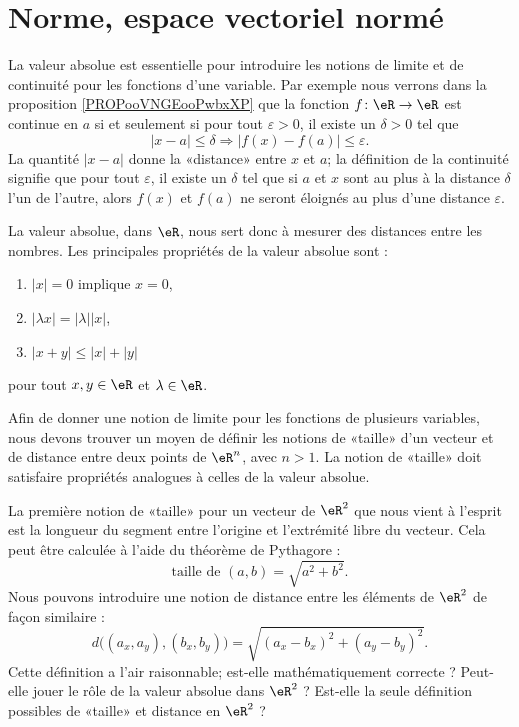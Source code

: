 \section{Norme, espace vectoriel normé}
\label{SECooWKJNooKOqpsx}

La valeur absolue est essentielle pour introduire les notions de limite et de continuité pour les fonctions d'une variable. Par exemple nous verrons dans la proposition \ref{PROPooVNGEooPwbxXP} que la fonction \( f\colon \eR\to \eR\) est continue en \( a\) si et seulement si pour tout $\varepsilon > 0$, il existe un $\delta > 0$ tel que
  \begin{equation}
    | x-a |\leq\delta \Rightarrow | f(x)-f(a) |\leq \varepsilon.
  \end{equation}
La quantité $| x-a |$ donne la «distance» entre $x$ et $a$; la définition de la continuité signifie que pour tout $\varepsilon$, il existe un $\delta$ tel que si $a$ et $x$ sont au plus à la distance $\delta$ l'un de l'autre, alors $f(x)$ et $f(a)$ ne seront éloignés au plus d'une distance $\varepsilon$.

La valeur absolue, dans $\eR$, nous sert donc à mesurer des distances entre les nombres. Les principales propriétés de la valeur absolue sont :
\begin{enumerate}

	\item
		$| x |=0$ implique $x=0$,
	\item
		$| \lambda x |=| \lambda | |x |$,
	\item
		$| x+y |\leq | x |+| y |$

\end{enumerate}
pour tout $x,y\in\eR$ et $\lambda\in\eR$.

Afin de donner une notion de limite pour les fonctions de plusieurs variables, nous devons trouver un moyen de définir les notions de «taille» d'un vecteur et de distance entre deux points de $\eR^n$, avec $n>1$. La notion de «taille» doit satisfaire propriétés analogues à celles de la valeur absolue.

La première notion de «taille» pour un vecteur de $\eR^2$ que nous vient à l'esprit est la longueur du segment entre l'origine et l'extrémité libre du vecteur. Cela peut être calculée à l'aide du théorème de Pythagore :
\begin{equation}
  \textrm{taille de } (a,b) = \sqrt{a^2+b^2}.
\end{equation}
Nous pouvons introduire une notion de distance entre les éléments de $\eR^2$ de façon similaire :
\begin{equation}
	d\big((a_x,a_y),(b_x,b_y)\big)=\sqrt{  (a_x-b_x)^2+(a_y-b_y)^2  }.
\end{equation}
Cette définition a l'air raisonnable; est-elle mathématiquement correcte ? Peut-elle jouer le rôle de la valeur absolue dans $\eR^2$ ? Est-elle la seule définition possibles de «taille» et distance en $\eR^2$ ?


